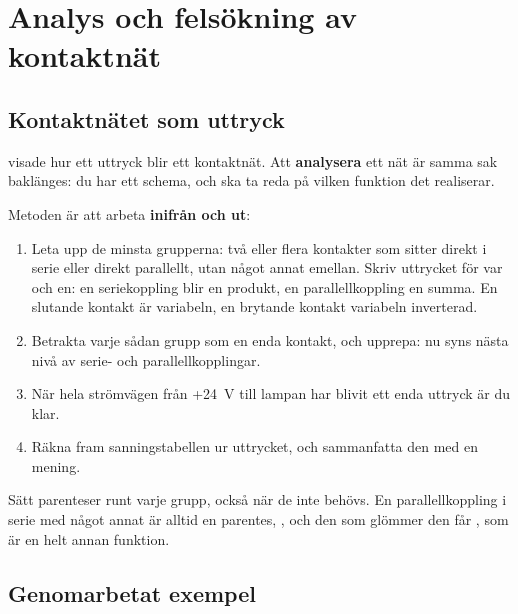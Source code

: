 %

\section{Analys och felsökning av kontaktnät}
\label{c3:app:a}

\subsection{Kontaktnätet som uttryck}
\label{c3:a1}
 visade hur ett uttryck blir ett kontaktnät. Att \textbf{analysera} ett nät är samma
sak baklänges: du har ett schema, och ska ta reda på vilken funktion det realiserar.

Metoden är att arbeta \textbf{inifrån och ut}:
\begin{enumerate}
  \item Leta upp de minsta grupperna: två eller flera kontakter som sitter direkt i serie eller
    direkt parallellt, utan något annat emellan. Skriv uttrycket för var och en: en seriekoppling
    blir en produkt, en parallellkoppling en summa. En slutande kontakt är variabeln, en brytande
    kontakt variabeln inverterad.
  \item Betrakta varje sådan grupp som en enda kontakt, och upprepa: nu syns nästa nivå av serie-
    och parallellkopplingar.
  \item När hela strömvägen från +24~V till lampan har blivit ett enda uttryck är du klar.
  \item Räkna fram sanningstabellen ur uttrycket, och sammanfatta den med en mening.
\end{enumerate}

Sätt parenteser runt varje grupp, också när de inte behövs. En parallellkoppling i serie med något
annat är alltid en parentes, , och den som glömmer den får
, som är en helt annan funktion.

\subsection{Genomarbetat exempel}
\label{c3:a2}


